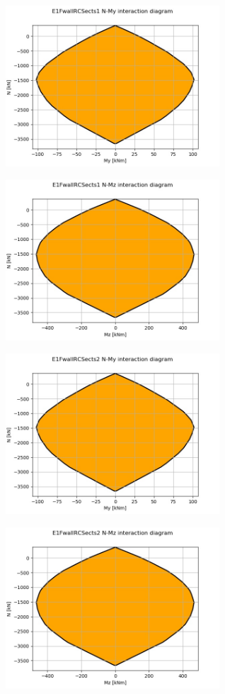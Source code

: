
\begin{center}
\includegraphics[width=80mm]{ramp_wall/resLC/text/sections/E1FwallRCSects1NMy}
\end{center}
\begin{center}
\includegraphics[width=80mm]{ramp_wall/resLC/text/sections/E1FwallRCSects1NMz}
\end{center}

\begin{center}
\includegraphics[width=80mm]{ramp_wall/resLC/text/sections/E1FwallRCSects2NMy}
\end{center}
\begin{center}
\includegraphics[width=80mm]{ramp_wall/resLC/text/sections/E1FwallRCSects2NMz}
\end{center}
